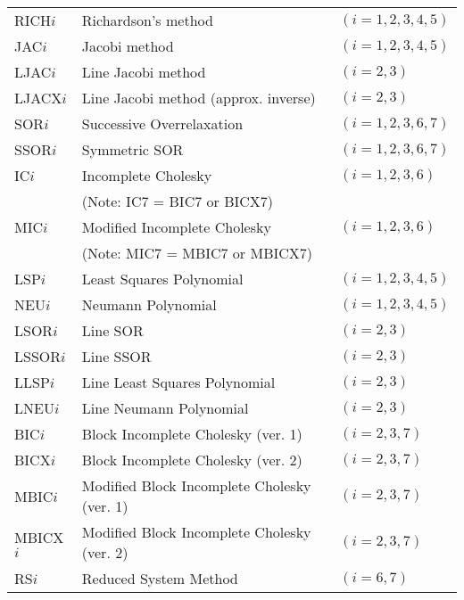 \bigskip
\begin{tabular}{lll}
 RICH$i$  & Richardson's method
          & $(i=1,2,3,4,5)$                            \\
 JAC$i$   & Jacobi method
          & $(i=1,2,3,4,5)$                            \\
 LJAC$i$  & Line Jacobi method
          & $(i=2,3)$                                  \\
 LJACX$i$ & Line Jacobi method (approx. inverse)
          & $(i=2,3)$                                  \\
 SOR$i$   & Successive Overrelaxation
          & $(i=1,2,3,6,7)$                            \\
 SSOR$i$  & Symmetric SOR
          & $(i=1,2,3,6,7)$                            \\
 IC$i$    & Incomplete Cholesky
          & $(i=1,2,3,6)$                              \\
          & (Note:  IC7 = BIC7 or BICX7)
          &                                            \\
 MIC$i$   & Modified Incomplete Cholesky
          & $(i=1,2,3,6)$                              \\
          & (Note:  MIC7 = MBIC7 or MBICX7)
          &                                            \\
 LSP$i$   & Least Squares Polynomial
          & $(i=1,2,3,4,5)$                            \\
 NEU$i$   & Neumann Polynomial
          & $(i=1,2,3,4,5)$                            \\
 LSOR$i$  & Line SOR
          & $(i=2,3)$                                  \\
 LSSOR$i$ & Line SSOR
          & $(i=2,3)$                                  \\
 LLSP$i$  & Line Least Squares Polynomial
          & $(i=2,3)$                                  \\
 LNEU$i$  & Line Neumann Polynomial
          & $(i=2,3)$                                  \\
 BIC$i$   & Block Incomplete Cholesky (ver. 1)
          & $(i=2,3,7)$                                \\
 BICX$i$  & Block Incomplete Cholesky (ver. 2)
          & $(i=2,3,7)$                                \\
 MBIC$i$  & Modified Block Incomplete Cholesky (ver. 1)
          & $(i=2,3,7)$                                \\
 MBICX$i$ & Modified Block Incomplete Cholesky (ver. 2)
          & $(i=2,3,7)$                                \\
 RS$i$    & Reduced System Method
          & $(i=6,7)$
\end{tabular}
 
